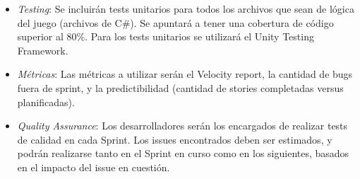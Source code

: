 \documentclass[a4paper]{article}
\begin{document}
\begin{itemize}
    \item \textit{Testing}: Se incluirán tests unitarios para todos los archivos que sean de lógica del juego (archivos de C\#). Se apuntará a tener una cobertura de código superior al 80\%. Para los tests unitarios se utilizará el Unity Testing Framework.
    \item \textit{Métricas}: Las métricas a utilizar serán el Velocity report, la cantidad de bugs fuera de sprint, y la predictibilidad (cantidad de stories completadas versus planificadas).
    \item \textit{Quality Assurance}: Los desarrolladores serán los encargados de realizar tests de calidad en cada Sprint. Los issues encontrados deben ser estimados, y podrán realizarse tanto en el Sprint en curso como en los siguientes, basados en el impacto del issue en cuestión.
\end{itemize}



\end{document}
